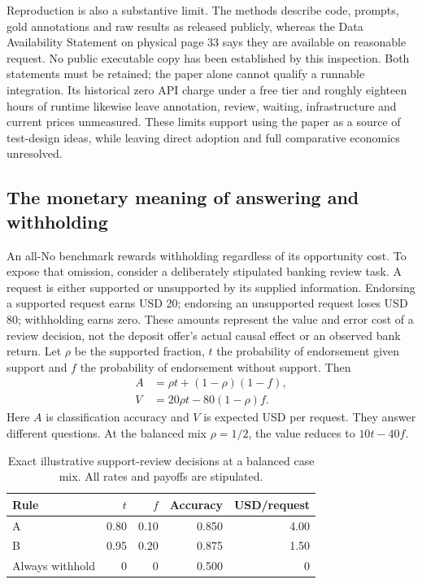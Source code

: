 Reproduction is also a substantive limit. The methods describe code, prompts,
gold annotations and raw results as released publicly, whereas the Data
Availability Statement on physical page 33 says they are available on
reasonable request. No public executable copy has been established by this
inspection. Both statements must be retained; the paper alone cannot qualify
a runnable integration. Its historical zero API charge under a free tier and
roughly eighteen hours of runtime likewise leave annotation, review, waiting,
infrastructure and current prices unmeasured. These limits support using the
paper as a source of test-design ideas, while leaving direct adoption and full
comparative economics unresolved.\citep{exec17_benchmark_cherif}

\subsection{The monetary meaning of answering and withholding}

An all-No benchmark rewards withholding regardless of its opportunity cost.
To expose that omission, consider a deliberately stipulated banking review
task. A request is either supported or unsupported by its supplied information.
Endorsing a supported request earns USD 20; endorsing an unsupported request
loses USD 80; withholding earns zero. These amounts represent the value and
error cost of a review decision, not the deposit offer's actual causal effect
or an observed bank return. Let $\rho$ be the supported fraction, $t$ the
probability of endorsement given support and $f$ the probability of endorsement
without support. Then
\begin{align}
 A&=\rho t+(1-\rho)(1-f),
       \label{exec17:benchmark-accuracy}\\
 V&=20\rho t-80(1-\rho)f.
       \label{exec17:benchmark-value}
\end{align}
Here $A$ is classification accuracy and $V$ is expected USD per request.
They answer different questions. At the balanced mix $\rho=1/2$, the value
reduces to $10t-40f$.
\citep{exec17_benchmark_exact}

\begin{table}[htbp]
\centering
\caption{Exact illustrative support-review decisions at a balanced case mix.
All rates and payoffs are stipulated.}
\label{exec17:benchmark-bank-table}
\begin{tabular}{lrrrr}
\toprule
Rule & $t$ & $f$ & Accuracy & USD/request\\
\midrule
A & 0.80 & 0.10 & 0.850 & 4.00\\
B & 0.95 & 0.20 & 0.875 & 1.50\\
Always withhold & 0 & 0 & 0.500 & 0\\
\bottomrule
\end{tabular}
\end{table}

